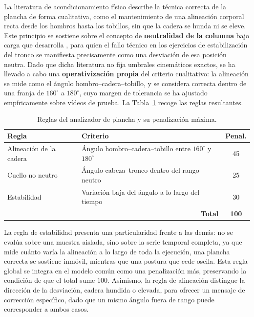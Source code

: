 \documentclass[12pt,a4paper,twoside,openright]{book}
\begin{document}
    La literatura de acondicionamiento físico describe la técnica correcta de la
    plancha de forma cualitativa, como el mantenimiento de una alineación
    corporal recta desde los hombros hasta los tobillos, sin que la cadera se
    hunda ni se eleve. Este principio se sostiene sobre el concepto de
    \textbf{neutralidad de la columna} bajo carga que desarrolla
    \textcite{mcgill2015}, para quien el fallo técnico en los ejercicios de
    estabilización del tronco se manifiesta precisamente como una desviación de
    esa posición neutra. Dado que dicha literatura no fija umbrales cinemáticos
    exactos, se ha llevado a cabo una \textbf{operativización propia} del
    criterio cualitativo: la alineación se mide como el ángulo
    hombro--cadera--tobillo, y se considera correcta dentro de una franja de
    $160^\circ$ a $180^\circ$, cuyo margen de tolerancia se ha ajustado
    empíricamente sobre vídeos de prueba. La Tabla~\ref{tab:reglas-plancha}
    recoge las reglas resultantes.

    \begin{table}[htbp]
        \centering
        \small
        \begin{tabular}{p{4.6cm} p{5.2cm} c}
            \toprule
            \textbf{Regla} & \textbf{Criterio} & \textbf{Penal.} \\
            \midrule
            Alineación de la cadera & Ángulo hombro--cadera--tobillo entre $160^\circ$ y $180^\circ$ & 45 \\
            Cuello no neutro        & Ángulo cabeza--tronco dentro del rango neutro & 25 \\
            Estabilidad             & Variación baja del ángulo a lo largo del tiempo & 30 \\
            \midrule
            \multicolumn{2}{r}{\textbf{Total}} & \textbf{100} \\
            \bottomrule
        \end{tabular}
        \caption{Reglas del analizador de plancha y su penalización máxima.}
        \label{tab:reglas-plancha}
    \end{table}

    La regla de estabilidad presenta una particularidad frente a las demás: no
    se evalúa sobre una muestra aislada, sino sobre la serie temporal completa,
    ya que mide cuánto varía la alineación a lo largo de toda la ejecución, una
    plancha correcta se sostiene inmóvil, mientras que una postura que cede
    oscila. Esta regla global se integra en el modelo común como una
    penalización más, preservando la condición de que el total sume $100$.
    Asimismo, la regla de alineación distingue la dirección de la desviación,
    cadera hundida o elevada, para ofrecer un mensaje de corrección
    específico, dado que un mismo ángulo fuera de rango puede corresponder a
    ambos casos.
\end{document}
